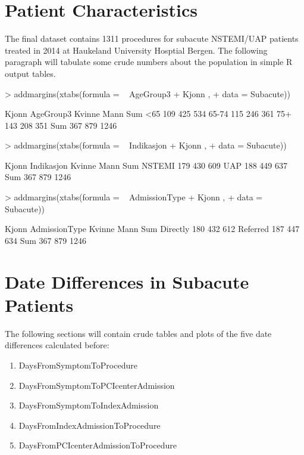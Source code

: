 \documentclass[a4paper]{report}
\begin{document}
\begin{itemize}
{\section{Patient Characteristics}
The final dataset contains 1311 procedures for subacute NSTEMI/UAP patients treated in 2014 at Haukeland University Hosptial Bergen. The following paragraph will tabulate some crude numbers about the population in simple R output tables.

\begin{Schunk}
\begin{Sinput}
> addmargins(xtabs(formula = ~ AgeGroup3 + Kjonn ,
+                  data = Subacute))
\end{Sinput}
\begin{Soutput}
         Kjonn
AgeGroup3 Kvinne Mann  Sum
    <65      109  425  534
    65-74    115  246  361
    75+      143  208  351
    Sum      367  879 1246
\end{Soutput}
\begin{Sinput}
> addmargins(xtabs(formula = ~ Indikasjon + Kjonn ,
+                  data = Subacute))
\end{Sinput}
\begin{Soutput}
          Kjonn
Indikasjon Kvinne Mann  Sum
    NSTEMI    179  430  609
    UAP       188  449  637
    Sum       367  879 1246
\end{Soutput}
\begin{Sinput}
> addmargins(xtabs(formula = ~ AdmissionType + Kjonn ,
+                  data = Subacute))
\end{Sinput}
\begin{Soutput}
             Kjonn
AdmissionType Kvinne Mann  Sum
     Directly    180  432  612
     Referred    187  447  634
     Sum         367  879 1246
\end{Soutput}
\end{Schunk}




\clearpage
\section{Date Differences in Subacute Patients}

The following sections will contain crude tables and plots of the five date differences calculated before:
\begin{enumerate}
\item{DaysFromSymptomToProcedure}
\item{DaysFromSymptomToPCIcenterAdmission}
\item{DaysFromSymptomToIndexAdmission}
\item{DaysFromIndexAdmissionToProcedure}
\item{DaysFromPCIcenterAdmissionToProcedure}
\end{enumerate}

}
\end{itemize}
\end{document}
